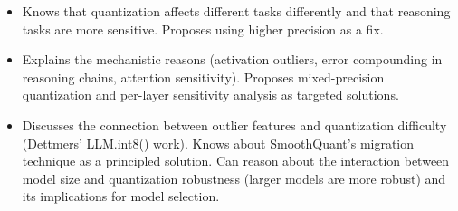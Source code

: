 \begin{interviewq}
\goodgreat
\begin{itemize}
    \item {} Knows that quantization affects different tasks differently and that reasoning tasks are more sensitive. Proposes using higher precision as a fix.
    \item {} Explains the mechanistic reasons (activation outliers, error compounding in reasoning chains, attention sensitivity). Proposes mixed-precision quantization and per-layer sensitivity analysis as targeted solutions.
    \item {} Discusses the connection between outlier features and quantization difficulty (Dettmers' LLM.int8() work). Knows about SmoothQuant's migration technique as a principled solution. Can reason about the interaction between model size and quantization robustness (larger models are more robust) and its implications for model selection.
\end{itemize}

\end{interviewq}

